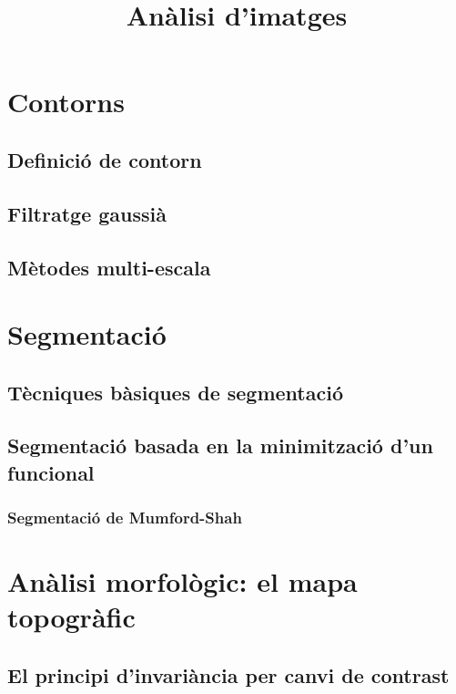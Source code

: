 \documentclass{article}
\title{An\`alisi d'imatges}
\date{}
\begin{document}
\maketitle
\tableofcontents

\section{Contorns}

\subsection{Definici\'o de contorn}

\subsection{Filtratge gaussi\`a}

\subsection{M\`etodes multi-escala}


\section{Segmentaci\'o}

\subsection{T\`ecniques b\`asiques de segmentaci\'o}

\subsection{Segmentaci\'o basada en la minimitzaci\'o d'un funcional}

\subsubsection{Segmentaci\'o de Mumford-Shah}

\section{An\`alisi morfol\`ogic: el mapa topogr\`afic}

\subsection{El principi d'invari\`ancia per canvi de contrast}
\end{document}

